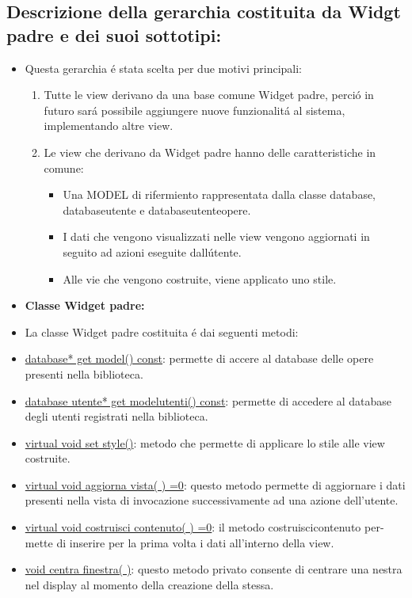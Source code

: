 \documentclass[10pt]{article}
\begin{document}
\subsection{Descrizione della gerarchia costituita da Widgt padre e dei suoi sottotipi:}
\begin{itemize}
	\item Questa gerarchia \'e stata scelta per due motivi principali:

		\begin{enumerate}
		\item Tutte le view derivano da una base comune Widget padre, perci\'o in futuro sar\'a possibile aggiungere nuove funzionalit\'a al sistema, 				implementando altre view.
		\item Le view che derivano da Widget padre hanno delle caratteristiche in comune:
		\begin{itemize}
		\item Una MODEL di rifermiento rappresentata dalla classe database, databaseutente  e databaseutenteopere.
		\item I dati che vengono visualizzati nelle view vengono aggiornati in seguito ad azioni eseguite dall\'utente.
		\item Alle vie che vengono costruite, viene applicato uno stile.
		\end{itemize}
		\end{enumerate}

\item \textbf{Classe Widget padre:}


\item La classe Widget padre costituita \'e dai seguenti metodi:

		\item \underline{database* get model() const}: permette di accere al database delle opere presenti nella biblioteca.

		\item \underline{database utente* get modelutenti() const}: permette di accedere al database degli utenti registrati nella biblioteca.

		\item \underline{virtual void set style()}: metodo che permette di applicare lo stile alle view costruite.

		\item \underline{virtual void aggiorna vista( ) =0}: questo metodo permette di aggiornare
		i dati presenti nella vista di invocazione successivamente ad una azione dell'utente.

		\item \underline{virtual void costruisci contenuto( ) =0}: il metodo costruiscicontenuto per-mette di inserire per la prima volta i dati all'interno della view.

		\item \underline{void centra finestra( )}: questo metodo privato consente di centrare una nestra nel display al momento della creazione della stessa.
\end{itemize}
\end{document}
